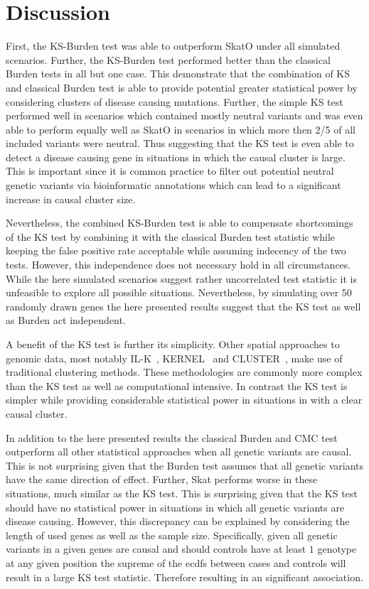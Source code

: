 \section{Discussion}
\label{sec:discussion_ks}

First, the KS-Burden test was able to outperform SkatO under all simulated scenarios.
Further, the KS-Burden test performed better than the classical Burden tests in all but one case.
This demonstrate that the combination of KS and classical Burden test is able to provide potential greater statistical power by considering clusters of disease causing mutations.
Further, the simple KS test performed well in scenarios which contained mostly neutral variants and was even able to perform equally well as SkatO in scenarios in which more then 2/5 of all included variants were neutral.
Thus suggesting that the KS test is even able to detect a disease causing gene in situations in which the causal cluster is large.
This is important since it is common practice to filter out potential neutral genetic variants via bioinformatic annotations which can lead to a significant increase in causal cluster size.

Nevertheless, the combined KS-Burden test is able to compensate shortcomings of the KS test by combining it with the classical Burden test statistic while keeping the false positive rate acceptable while assuming indecency of the two tests.
However, this independence does not necessary hold in all circumstances.
While the here simulated scenarios suggest rather uncorrelated test statistic it is unfeasible to explore all possible situations.   
Nevertheless, by simulating over 50 randomly drawn genes the here presented results suggest that the KS test as well as Burden act independent.

A benefit of the KS test is further its simplicity.
Other spatial approaches to genomic data, most notably IL-K~\cite{Ionita-Laza2012}, KERNEL~\cite{Schaid2013} and CLUSTER~\cite{Lin2014}, make use of traditional clustering methods.
These methodologies are commonly more complex than the KS test as well as computational intensive.
In contrast the KS test is simpler while providing considerable statistical power in situations in with a clear causal cluster.

In addition to the here presented results the classical Burden and CMC test outperform all other statistical approaches when all genetic variants are causal.
This is not surprising given that the Burden test assumes that all genetic variants have the same direction of effect.
Further, Skat performs worse in these situations, much similar as the KS test.
This is surprising given that the KS test should have no statistical power in situations in which all genetic variants are disease causing.
However, this discrepancy can be explained by considering the length of used genes as well as the sample size.
Specifically, given all genetic variants in a given genes are causal and should controls have at least $1$ genotype at any given position the supreme of the ecdfs between cases and controls will result in a large KS test statistic.
Therefore resulting in an significant association.
